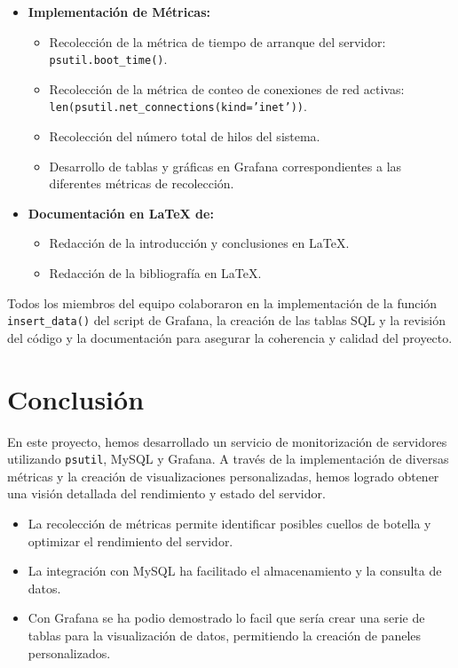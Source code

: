 \documentclass{article}
\begin{document}
\begin{itemize}
    \item \textbf{Implementación de Métricas:}
    \begin{itemize}
        \item Recolección de la métrica de tiempo de arranque del servidor: \texttt{psutil.boot\_time()}.
        \item Recolección de la métrica de conteo de conexiones de red activas: \texttt{len(psutil.net\_connections(kind='inet'))}.
        \item Recolección del número total de hilos del sistema.
        \item Desarrollo de tablas y gráficas en Grafana correspondientes a las diferentes métricas de recolección.
    \end{itemize}
    \item \textbf{Documentación en \LaTeX{} de:}
    \begin{itemize}
        \item Redacción de la introducción y conclusiones en \LaTeX{}.
        \item Redacción de la bibliografía en \LaTeX{}.
    \end{itemize}
\end{itemize}

\vspace{1em}
\noindent Todos los miembros del equipo colaboraron en la implementación de la función \texttt{insert\_data()} del script de Grafana, la creación de las tablas SQL y la revisión del código y la documentación para asegurar la coherencia y calidad del proyecto.

\section{Conclusión}
En este proyecto, hemos desarrollado un servicio de monitorización de servidores utilizando \texttt{psutil}, MySQL y Grafana. A través de la implementación de diversas métricas y la creación de visualizaciones personalizadas, hemos logrado obtener una visión detallada del rendimiento y estado del servidor.

\begin{itemize}
    \item La recolección de métricas permite identificar posibles cuellos de botella y optimizar el rendimiento del servidor.
    \item La integración con MySQL ha facilitado el almacenamiento y la consulta de datos.
    \item Con Grafana se ha podio demostrado lo facil que sería crear una serie de tablas para la visualización de datos, permitiendo la creación de paneles personalizados.
\end{itemize}
\end{document}
